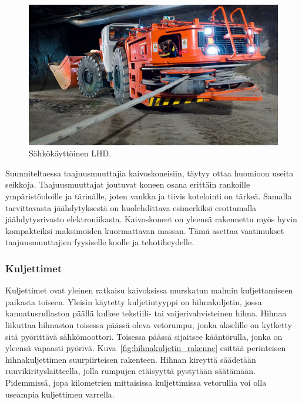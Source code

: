 \documentclass[finnish,12pt,a4paper,pdftex,elec,utf8]{aaltothesis}
\begin{document}
\\\\
\begin{figure}[H]
	\begin{center}
	\includegraphics[scale=0.35]{LHD}
	\end{center}
	\caption{Sähkökäyttöinen LHD.
		\cite{LHD}}
	\label{fig:LHD}
\end{figure}
\noindent
Suunniteltaessa taajuusmuuttajia kaivoskoneisiin, täytyy ottaa huomioon useita seikkoja. Taajuusmuuttajat joutuvat koneen osana erittäin rankoille ympäristöoloille ja tärinälle, joten vankka ja tiivis kotelointi on tärkeä. Samalla tarvittavasta jäähdytyksestä on huolehdittava esimerkiksi erottamalla jäähdytysrivasto elektroniikasta. Kaivoskoneet on yleensä rakennettu myös hyvin kompakteiksi maksimoiden kuormattavan massan. Tämä asettaa vaatimukset taajuusmuuttajien fyysiselle koolle ja tehotiheydelle.

\subsubsection{Kuljettimet}
Kuljettimet ovat yleinen ratkaisu kaivoksissa murskatun malmin kuljettamiseen paikasta toiseen. Yleisin käytetty kuljetintyyppi on hihnakuljetin, jossa kannatusrullaston päällä kulkee tekstiili- tai vaijerivahvisteinen hihna. Hihnaa liikuttaa hihnaston toisessa päässä oleva vetorumpu, jonka akselille on kytketty sitä pyörittävä sähkömoottori. Toisessa päässä sijaitsee kääntörulla, jonka on yleensä vapaasti pyörivä. Kuva~\ref{fig:hihnakuljetin_rakenne} esittää perinteisen hihnakuljettimen suurpiirteisen rakenteen. Hihnan kireyttä säädetään ruuvikirityslaitteella, jolla rumpujen etäisyyttä pystytään säätämään. Pidemmissä, jopa kilometrien mittaisissa kuljettimissa vetorullia voi olla useampia kuljettimen varrella.\cite{Hakapää}
\end{document}
